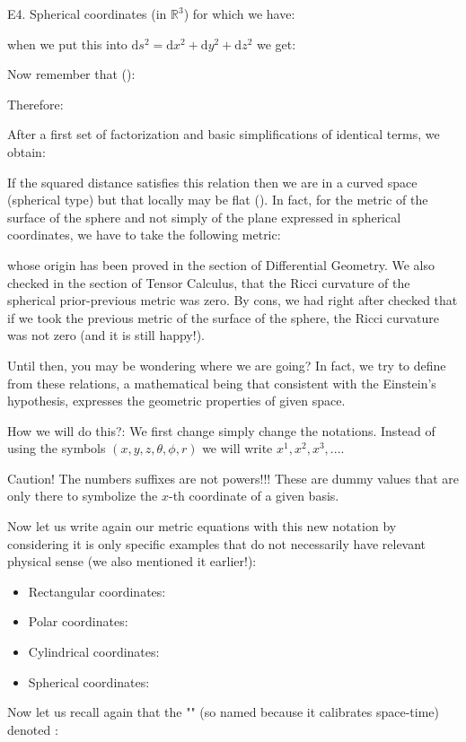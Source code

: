 	\pagebreak
	\begin{tcolorbox}[colframe=black,colback=white,sharp corners]	
	E4. Spherical coordinates (in $\mathbb{R}^3$) for which we have:
	
	when we put this into $\mathrm{d}s^2=\mathrm{d}x^2+\mathrm{d}y^2+\mathrm{d}z^2$ we get:
	
	Now remember that ():
	
	Therefore:
	
	After a first set of factorization and basic simplifications of identical terms, we obtain:
	
	If the squared  distance satisfies this relation then we are in a curved space (spherical type) but that locally may be flat (). In fact, for the metric of the surface of the sphere and not simply of the plane expressed in spherical coordinates, we have to take the following metric:
	
	whose origin has been proved in the section of Differential Geometry. We also checked in the section of Tensor Calculus, that the Ricci curvature of the spherical prior-previous metric was zero. By cons, we had right after checked that if we took the previous metric of the surface of the sphere, the Ricci curvature was not zero (and it is still happy!).
	\end{tcolorbox}
	Until then, you may be wondering where we are going? In fact, we try to define from these relations, a mathematical being that consistent with the Einstein's hypothesis, expresses the geometric properties of given space.
	
	How we will do this?: We first change simply change the notations. Instead of using the symbols $(x,y,z,\theta,\phi,r)$ we will write $x^1,x^2,x^3,...$. 
	
	\begin{tcolorbox}[colback=red!5,borderline={1mm}{2mm}{red!5},arc=0mm,boxrule=0pt]
	\bcbombe Caution! The numbers suffixes are not powers!!! These are dummy values that are only there to symbolize the $x$-th coordinate of a given basis.
	\end{tcolorbox}
	
	Now let us write again our metric equations with this new notation by considering it is only specific examples that do not necessarily have relevant physical sense (we also mentioned it earlier!):
	\begin{itemize}
		\item Rectangular coordinates:
		
		\item Polar coordinates:
		
		\item Cylindrical coordinates:
		
		\item Spherical coordinates:
		
	\end{itemize}
	Now let us recall again that the "\label{metric tensor}" (so named because it calibrates space-time) denoted :
	
